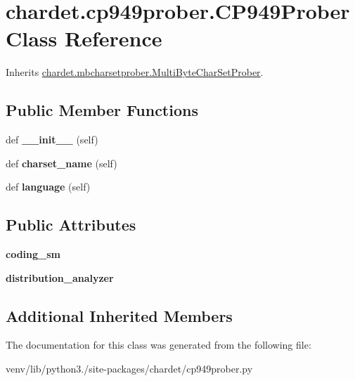 \hypertarget{classchardet_1_1cp949prober_1_1_c_p949_prober}{}\section{chardet.\+cp949prober.\+C\+P949\+Prober Class Reference}
\label{classchardet_1_1cp949prober_1_1_c_p949_prober}


Inherits \hyperlink{classchardet_1_1mbcharsetprober_1_1_multi_byte_char_set_prober}{chardet.\+mbcharsetprober.\+Multi\+Byte\+Char\+Set\+Prober}.

\subsection*{Public Member Functions}
\begin{DoxyCompactItemize}
\item 
\mbox{\label{classchardet_1_1cp949prober_1_1_c_p949_prober_aeb9deba58f191ed7c470f36445a7a0ea}} 
def {\bfseries \+\_\+\+\_\+init\+\_\+\+\_\+} (self)
\item 
\mbox{\label{classchardet_1_1cp949prober_1_1_c_p949_prober_abb3fac29f5c131fd6dbde7f82abdda8c}} 
def {\bfseries charset\+\_\+name} (self)
\item 
\mbox{\label{classchardet_1_1cp949prober_1_1_c_p949_prober_a5b62382f90600c154b6a061483252f79}} 
def {\bfseries language} (self)
\end{DoxyCompactItemize}
\subsection*{Public Attributes}
\begin{DoxyCompactItemize}
\item 
\mbox{\label{classchardet_1_1cp949prober_1_1_c_p949_prober_a7df873b74cd2dc2b5ff6edd078b626d3}} 
{\bfseries coding\+\_\+sm}
\item 
\mbox{\label{classchardet_1_1cp949prober_1_1_c_p949_prober_a3f5309b3190f7b24526845e4e1870fcf}} 
{\bfseries distribution\+\_\+analyzer}
\end{DoxyCompactItemize}
\subsection*{Additional Inherited Members}


The documentation for this class was generated from the following file\+:\begin{DoxyCompactItemize}
\item 
venv/lib/python3./site-\/packages/chardet/cp949prober.\+py\end{DoxyCompactItemize}
